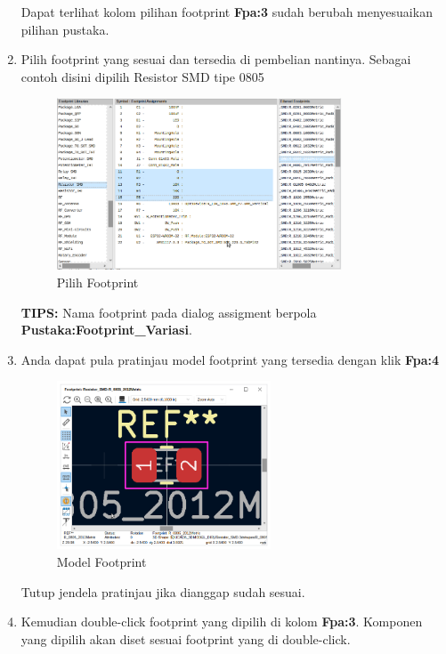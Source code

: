 \documentclass[12pt]{book}
\begin{document}
\begin{enumerate}
		Dapat terlihat kolom pilihan footprint \textbf{Fpa:3} sudah berubah menyesuaikan pilihan pustaka.

		\item Pilih footprint yang sesuai dan tersedia di pembelian nantinya.
		Sebagai contoh disini dipilih Resistor SMD tipe 0805

		\begin{figure}[!ht]
			\centering
			\includegraphics[width=0.8\textwidth]{images/fpa/fpa_4}
			\caption{Pilih Footprint}
		\end{figure}

		\textbf{TIPS:} Nama footprint pada dialog assigment berpola \textbf{Pustaka:Footprint\_Variasi}.

		\newpage
		\item Anda dapat pula pratinjau model footprint yang tersedia dengan klik \textbf{Fpa:4}

		\begin{figure}[!ht]
			\centering
			\includegraphics[width=0.6\textwidth]{images/fpa/fpa_5}
			\caption{Model Footprint}
		\end{figure}

		Tutup jendela pratinjau jika dianggap sudah sesuai.

		\item Kemudian double-click footprint yang dipilih di kolom \textbf{Fpa:3}.
		Komponen yang dipilih akan diset sesuai footprint yang di double-click.


\end{enumerate}
\end{document}
